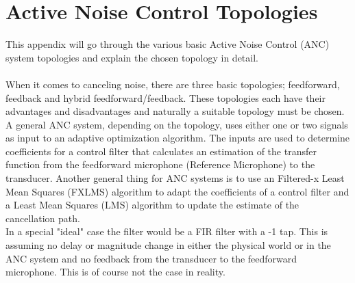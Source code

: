 \section{Active Noise Control Topologies} \label{sec:BasicSystem}
This appendix will go through the various basic Active Noise Control (ANC) system topologies and explain the chosen topology in detail. \\\\
When it comes to canceling noise, there are three basic topologies; feedforward, feedback and hybrid feedforward/feedback. These topologies each have their advantages and disadvantages and naturally a suitable topology must be chosen.
A general ANC system, depending on the topology, uses either one or two signals as input to an adaptive optimization algorithm. The inputs are used to determine coefficients for a control filter that calculates an estimation of the transfer function from the feedforward microphone (Reference Microphone) to the transducer. Another general thing for ANC systems is to use an Filtered-x Least Mean Squares (FXLMS) algorithm to adapt the coefficients of a control filter and a Least Mean Squares (LMS) algorithm to update the estimate of the cancellation path.\\
In a special "ideal" case the filter would be a FIR filter with a -1 tap. This is assuming no delay or magnitude change in either the physical world or in the ANC system and no feedback from the transducer to the feedforward microphone. This is of course not the case in reality. 


